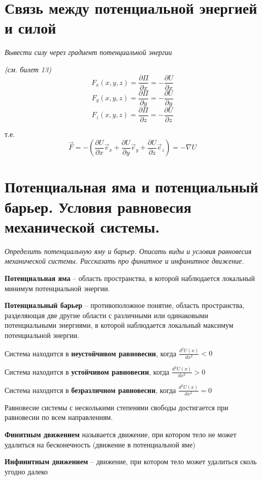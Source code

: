 \documentclass{article}
\begin{document}
   \section{Связь между потенциальной энергией и силой}
    \par
      \textit{Вывести силу через градиент потенциальной энергии}\\
    \par
      \textit{(см. билет 13)}
      \begin{equation}
	F_x(x,y,z)=\frac{\partial \Pi}{\partial x}=-\frac{\partial U}{\partial x}
      \end{equation}
      \begin{equation}
	F_y(x,y,z)=\frac{\partial \Pi}{\partial y}=-\frac{\partial U}{\partial y}
      \end{equation}
      \begin{equation}
	F_z(x,y,z)=\frac{\partial \Pi}{\partial z}=-\frac{\partial U}{\partial z}
      \end{equation}
    \par
      т.е.
      \begin{equation}
	\vec F = -(\frac{\partial U}{\partial x}\vec e_x+\frac{\partial U}{\partial y}\vec e_y+\frac{\partial U}{\partial z}\vec e_z)=-\nabla U
      \end{equation}
  \clearpage
  
   \section{Потенциальная яма и потенциальный барьер. Условия равновесия механической системы.}
    \par
      \textit{Определить потенциальную яму и барьер. Описать виды и условия равновесия механической системы. Рассказать про финитное и инфинитное движение.}\\
    \par
      \textbf{Потенциальная яма} -- область пространства, в которой наблюдается локальный минимум потенциальной энергии.
    \par
      \textbf{Потенциальный барьер} -- противоположное понятие, область пространства, разделяющая две другие области с различными или одинаковыми потенциальными энергиями, в которой наблюдается локальный максимум потенциальной энергии.
    \par
      Система находится в \textbf{неустойчивом равновесии}, когда $\frac{d^2U(x)}{dx^2}<0$
    \par
      Система находится в \textbf{устойчивом равновесии}, когда $\frac{d^2U(x)}{dx^2}>0$
    \par
      Система находится в \textbf{безразличном равновесии}, когда $\frac{d^2U(x)}{dx^2}=0$
    \par
      Равновесие системы с несколькими степенями свободы достигается при равновесии по всем направлениям.
    \par
      \textbf{Финитным движением} называется движение, при котором тело не может удалиться на бесконечность (движение в потенциальной яме)
    \par
      \textbf{Инфинитным движением} -- движение, при котором тело может удалиться сколь угодно далеко
  \clearpage
  
\end{document}
